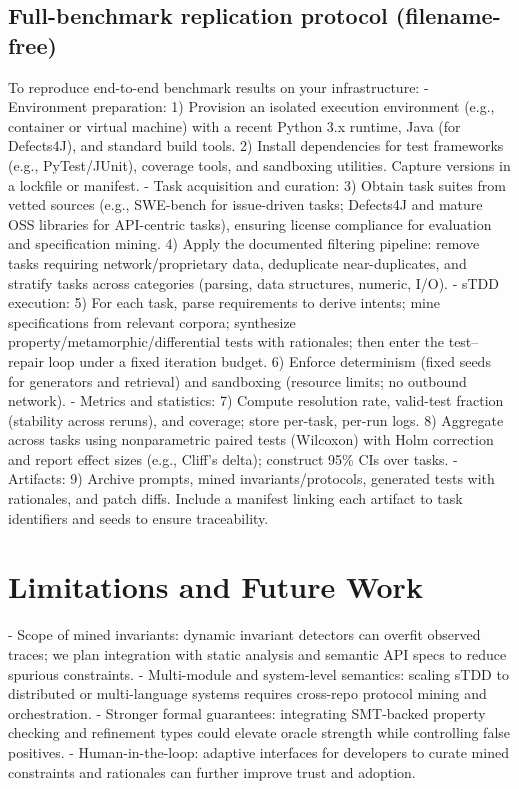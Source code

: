 \documentclass[10pt,twocolumn]{article}
\begin{document}
\subsection*{Full-benchmark replication protocol (filename-free)}
To reproduce end-to-end benchmark results on your infrastructure:
- Environment preparation:
  1) Provision an isolated execution environment (e.g., container or virtual machine) with a recent Python 3.x runtime, Java (for Defects4J), and standard build tools.
  2) Install dependencies for test frameworks (e.g., PyTest/JUnit), coverage tools, and sandboxing utilities. Capture versions in a lockfile or manifest.
- Task acquisition and curation:
  3) Obtain task suites from vetted sources (e.g., SWE-bench for issue-driven tasks; Defects4J and mature OSS libraries for API-centric tasks), ensuring license compliance for evaluation and specification mining.
  4) Apply the documented filtering pipeline: remove tasks requiring network/proprietary data, deduplicate near-duplicates, and stratify tasks across categories (parsing, data structures, numeric, I/O).
- sTDD execution:
  5) For each task, parse requirements to derive intents; mine specifications from relevant corpora; synthesize property/metamorphic/differential tests with rationales; then enter the test–repair loop under a fixed iteration budget.
  6) Enforce determinism (fixed seeds for generators and retrieval) and sandboxing (resource limits; no outbound network).
- Metrics and statistics:
  7) Compute resolution rate, valid-test fraction (stability across reruns), and coverage; store per-task, per-run logs.
  8) Aggregate across tasks using nonparametric paired tests (Wilcoxon) with Holm correction and report effect sizes (e.g., Cliff's delta); construct 95\% CIs over tasks.
- Artifacts:
  9) Archive prompts, mined invariants/protocols, generated tests with rationales, and patch diffs. Include a manifest linking each artifact to task identifiers and seeds to ensure traceability.

\section{Limitations and Future Work}
- Scope of mined invariants: dynamic invariant detectors can overfit observed traces; we plan integration with static analysis and semantic API specs to reduce spurious constraints.
- Multi-module and system-level semantics: scaling sTDD to distributed or multi-language systems requires cross-repo protocol mining and orchestration.
- Stronger formal guarantees: integrating SMT-backed property checking and refinement types could elevate oracle strength while controlling false positives.
- Human-in-the-loop: adaptive interfaces for developers to curate mined constraints and rationales can further improve trust and adoption.
\end{document}
